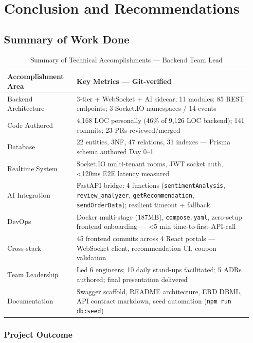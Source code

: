 \chapter{Conclusion and Recommendations}
\label{ch:conclusion}

\section{Summary of Work Done}

\begin{table}[H]
\centering
\caption{Summary of Technical Accomplishments --- Backend Team Lead}
\label{tab:summary_accomplishments}
\begin{tabularx}{\textwidth}{@{}p{}X@{}}
\toprule
\textbf{Accomplishment Area} & \textbf{Key Metrics --- Git-verified} \\
\midrule
Backend Architecture & 3-tier + WebSocket + AI sidecar; 11 modules; 85 REST endpoints; 3 Socket.IO namespaces / 14 events \\
Code Authored & 4,168 LOC personally (46\% of 9,126 LOC backend); 141 commits; 23 PRs reviewed/merged \\
Database & 22 entities, 3NF, 47 relations, 31 indexes --- Prisma schema authored Day 0--1 \\
Realtime System & Socket.IO multi-tenant rooms, JWT socket auth, <120ms E2E latency measured \\
AI Integration & FastAPI bridge: 4 functions (\texttt{sentimentAnalysis}, \texttt{review\_analyzer}, \texttt{getRecommendation}, \texttt{sendOrderData}); resilient timeout + fallback \\
DevOps & Docker multi-stage (187MB), \texttt{compose.yaml}, zero-setup frontend onboarding --- <5 min time-to-first-API-call \\
Cross-stack & 45 frontend commits across 4 React portals --- WebSocket client, recommendation UI, coupon validation \\
Team Leadership & Led 6 engineers; 10 daily stand-ups facilitated; 5 ADRs authored; final presentation delivered \\
Documentation & Swagger scaffold, README architecture, ERD DBML, API contract markdown, seed automation (\texttt{npm run db:seed}) \\
\bottomrule
\end{tabularx}
\end{table}

\subsection{Project Outcome}

